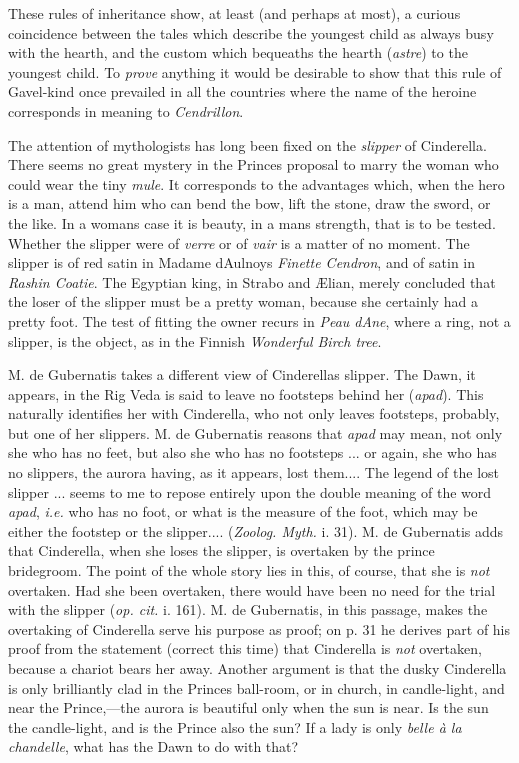 \documentclass[14pt,a4paper]{memoir}
\begin{document}
These rules of inheritance show, at least (and perhaps at most), a
curious coincidence between the tales which describe the youngest child
as always busy with the hearth, and the custom which bequeaths the
hearth (\emph{astre}) to the youngest child. To \emph{prove} anything it
would be desirable to show that this rule of Gavel-kind once prevailed
in all the countries where the name of the heroine corresponds in
meaning to \emph{Cendrillon}.

The attention of mythologists has long been fixed on the \emph{slipper}
of Cinderella. There seems no great mystery in the
Prince\textquotesingle s proposal to marry the woman who could wear the
tiny \emph{mule}. It corresponds to the advantages which, when the hero
is a man, attend him who can bend the bow, lift the stone, draw the
sword, or the like. In a woman\textquotesingle s case it is beauty, in a
man\textquotesingle s strength, that is to be tested. Whether the
slipper were of \emph{verre} or of \emph{vair} is a matter of no moment.
The slipper is of red satin in Madame
d\textquotesingle Aulnoy\textquotesingle s \emph{Finette Cendron}, and
of satin in \emph{Rashin Coatie}. The Egyptian king, in Strabo and
Ælian, merely concluded that the loser of the slipper must be a pretty
woman, because she certainly had a pretty foot. The test of fitting the
owner recurs in \emph{Peau d\textquotesingle Ane}, where a ring, not a
slipper, is the object, as in the Finnish \emph{Wonderful Birch tree}.

M. de Gubernatis takes a different view of Cinderella\textquotesingle s
slipper. The Dawn, it appears, in the Rig Veda is said to leave no
footsteps behind her (\emph{apad}). This naturally identifies her with
Cinderella, who not only leaves footsteps, probably, but one of her
slippers. M. de Gubernatis reasons that \emph{apad} \textquotesingle may
mean, not only she who has no feet, but also she who has no footsteps
... or again, she who has no slippers, the aurora having, as it appears,
lost them.... The legend of the lost slipper ... seems to me to repose
entirely upon the double meaning of the word \emph{apad}, \emph{i.e.}
who has no foot, or what is the measure of the foot, which may be either
the footstep or the slipper....\textquotesingle{} (\emph{Zoolog. Myth.}
i. 31). M. de Gubernatis adds that \textquotesingle Cinderella, when she
loses the slipper, is overtaken by the prince
bridegroom.\textquotesingle{} The point of the whole story lies in this,
of course, that she is \emph{not} overtaken. Had she been overtaken,
there would have been no need for the trial with the slipper (\emph{op.
cit.} i. 161). M. de Gubernatis, in this passage, makes the overtaking
of Cinderella serve his purpose as proof; on p. 31 he derives part of
his proof from the statement (correct this time) that Cinderella is
\emph{not} overtaken, \textquotesingle because a chariot bears her
away.\textquotesingle{} Another argument is that the dusky Cinderella is
only brilliantly clad \textquotesingle in the Prince\textquotesingle s
ball-room, or in church, in candle-light, and near the Prince,---the
aurora is beautiful only when the sun is near.\textquotesingle{} Is the
sun the candle-light, and is the Prince also the sun? If a lady is only
\emph{belle à la chandelle}, what has the Dawn to do with that?
\end{document}
